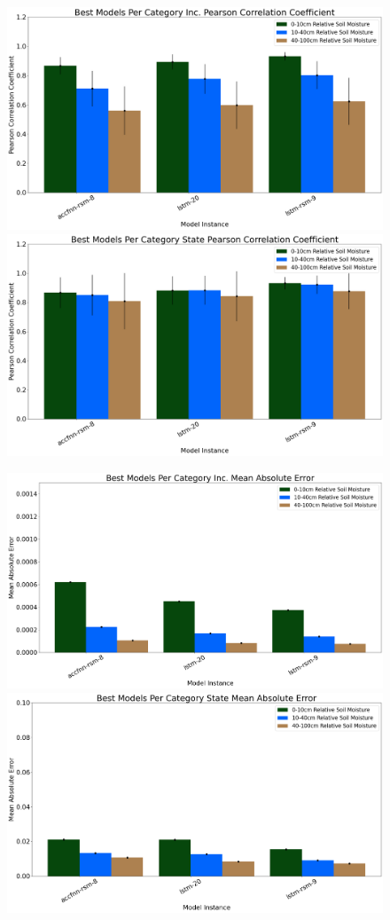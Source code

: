 \begin{figure}[hp!]
    \centering
    \includegraphics[width=.48\linewidth,draft=false]{figures/efficiency_initial-best/eval_test_efficiency_initial-best_cc_res.png}
    \includegraphics[width=.48\linewidth,draft=false]{figures/efficiency_initial-best/eval_test_efficiency_initial-best_cc_state.png}

    \includegraphics[width=.48\linewidth,draft=false]{figures/efficiency_initial-best/eval_test_efficiency_initial-best_mae_res.png}
    \includegraphics[width=.48\linewidth,draft=false]{figures/efficiency_initial-best/eval_test_efficiency_initial-best_mae_state.png}


\end{figure}
